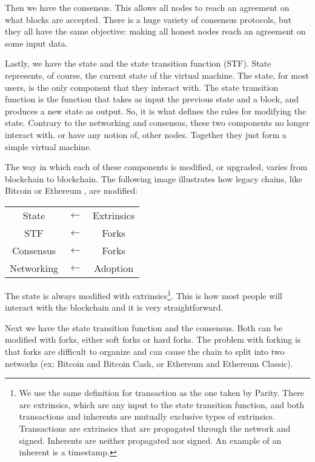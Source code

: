 \documentclass[conference]{IEEEtran}
\begin{document}
Then we have the consensus. This allows all nodes to reach an agreement on what blocks are accepted. There is a huge variety of consensus protocols, but they all have the same objective: making all honest nodes reach an agreement on some input data.

Lastly, we have the state and the state transition function (STF). State represents, of course, the current state of the virtual machine. The state, for most users, is the only component that they interact with. The state transition function is the function that takes as input the previous state and a block, and produces a new state as output. So, it is what defines the rules for modifying the state. Contrary to the networking and consensus, these two components no longer interact with, or have any notion of, other nodes. Together they just form a simple virtual machine.

The way in which each of these components is modified, or upgraded, varies from blockchain to blockchain. The following image illustrates how legacy chains, like Bitcoin \cite{nakamoto2008bitcoin} or Ethereum \cite{buterin2014next}, are modified:

\begin{center}
	\begin{tabular}{c c c}
		State & $\leftarrow$ & Extrinsics\\
		\cline{1-1}
		STF & $\leftarrow$ & Forks\\
		\cline{1-1}
		Consensus & $\leftarrow$ & Forks\\
		\cline{1-1}
		Networking & $\leftarrow$ & Adoption
	\end{tabular}
\end{center}

The state is always modified with extrinsics\footnote{We use the same definition for transaction as the one taken by Parity. There are extrinsics, which are any input to the state transition function, and both transactions and inherents are mutually exclusive types of extrinsics. Transactions are extrinsics that are propagated through the network and signed. Inherents are neither propagated nor signed. An example of an inherent is a timestamp.}. This is how most people will interact with the blockchain and it is very straightforward.

Next we have the state transition function and the consensus. Both can be modified with forks, either soft forks or hard forks. The problem with forking is that forks are difficult to organize and can cause the chain to split into two networks (ex: Bitcoin and Bitcoin Cash, or Ethereum and Ethereum Classic).
\end{document}
